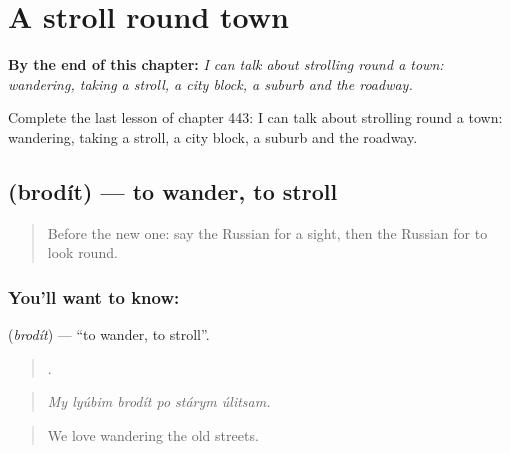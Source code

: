 
\chapter{A stroll round town}
\label{ch:ru-a-stroll-round-town}

\begin{chapteropening}
\textbf{By the end of this chapter:} \emph{I can talk about strolling round a town: wandering, taking a stroll, a city block, a suburb and the roadway.}

Complete the last lesson of chapter 443: I can talk about strolling round a town: wandering, taking a stroll, a city block, a suburb and the roadway.
\end{chapteropening}

\section[\texorpdfstring{\ru{бродить} (brodít)}{бродить (brodít)}]{ (brodít) — to wander, to stroll}

\label{lesson:RU-C443-brodit}



\begin{quote}
Before the new one: say the Russian for a sight, then the Russian for to look round.
\end{quote}

\subsection*{You'll want to know: }
\textbf{} (\emph{brodít}) — \textquotedblleft{}to wander, to stroll\textquotedblright{}.

\begin{quote}
     .
\end{quote}

\begin{quote}
\emph{My lyúbim brodít po stárym úlitsam.}
\end{quote}

\begin{quote}
We love wandering the old streets.
\end{quote}

